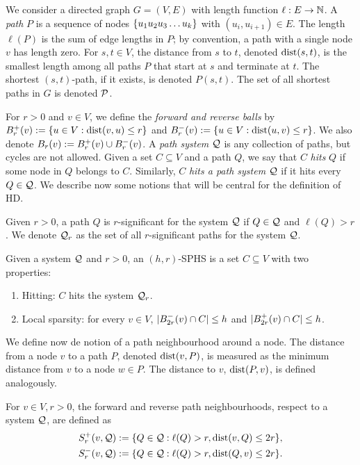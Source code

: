 
We consider a directed graph $G=(V,E)$ with length function $\ell:E\to \N$.
A \emph{path} $P$ is a sequence of nodes $\crl*{u_1u_2u_3\ldots u_k}$ with $(u_i,u_{i+1})\in E$. 
The length $\ell(P)$ is the sum of edge lengths in $P$; by convention, a path with a single node $v$ has length zero.
For $s,t\in V$, the distance from $s$ to $t$, denoted $\dist(s,t)$, is the smallest length among all paths $P$ that start at $s$ and terminate at $t$.
The shortest $(s,t)$-path, if it exists, is denoted $P(s,t)$.
The set of all shortest paths in $G$ is denoted $\calP$.

For $r>0$ and $v\in V$, we define the \emph{forward and reverse balls} by $\Bf_r(v):=\{u\in V: \dist(v,u)\leq r\}$ and $\Bb_r(v):=\{u\in V: \dist(u,v)\leq r\}$.
We also denote $B_r(v):=\Bf_r(v)\cup\Bb_r(v)$.
A \emph{path system} $\calQ$ is any collection of paths, but cycles are not allowed.
Given a set $C\subseteq V$ and a path $Q$, we say that $C$ \emph{hits} $Q$ if some node in $Q$ belongs to $C$.
Similarly, $C$ \emph{hits a path system} $\calQ$ if it hits every $Q\in\calQ$.
We describe now some notions that will be central for the definition of HD.

\begin{definition}
Given $r>0$, a path $Q$ is $r$-significant for the system $\calQ$ if $Q\in\calQ$ and $\ell(Q)>r$.
We denote $\calQ_r$ as the set of all $r$-significant paths for the system $\calQ$.
\end{definition}

\begin{definition}
Given a system $\calQ$ and $r>0$, an $(h,r)$-SPHS is a set $C\subseteq V$ with two properties: 
\begin{enumerate}
\item Hitting: $C$ hits the system $\calQ_r$.
\item Local sparsity: for every $v\in V$, $\card{\Bb_{2r}(v)\cap C}\leq h$ and $\card{\Bf_{2r}(v)\cap C}\leq h$.
\end{enumerate}
\end{definition}

We define now de notion of a path neighbourhood around a node.
The distance from a node $v$ to a path $P$, denoted $\dist(v,P)$, is measured as the minimum distance from $v$ to a node $w\in P$.
The distance to $v$, $\dist(P,v)$, is defined analogously.

\begin{definition}
For $v\in V, r>0$, the forward and reverse path neighbourhoods, respect to a system $\calQ$, are defined as 
\begin{align*}
S_r^+(v,\calQ) &:=\{Q\in\calQ:\ell(Q)>r,  \dist(v,Q)\leq 2r \}, \\  
S_r^-(v,\calQ) &:=\{Q\in\calQ:\ell(Q)>r,  \dist(Q,v)\leq 2r \}.
\end{align*}
\end{definition}

